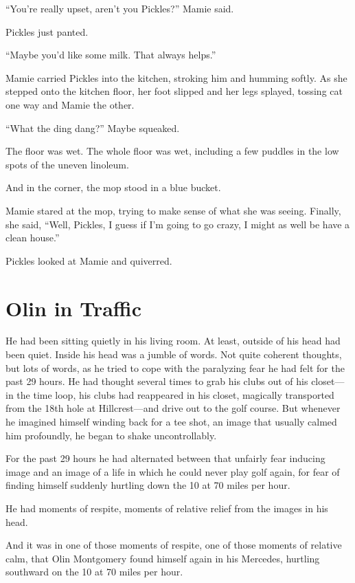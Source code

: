 ``You're really upset, aren't you Pickles?'' Mamie said.

Pickles just panted.

``Maybe you'd like some milk. That always helps.''

Mamie carried Pickles into the kitchen, stroking him and humming softly. As she stepped onto the kitchen floor, her foot slipped and her legs splayed, tossing cat one way and Mamie the other.

``What the ding dang?'' Maybe squeaked.

The floor was wet. The whole floor was wet, including a few puddles in the low spots of the uneven linoleum.

And in the corner, the mop stood in a blue bucket.

Mamie stared at the mop, trying to make sense of what she was seeing. Finally, she said, ``Well, Pickles, I guess if I'm going to go crazy, I might as well be have a clean house.''

Pickles looked at Mamie and quiverred.



\chapter{Olin in Traffic}

 He had been sitting quietly in his living room. At least, outside of his head had been quiet. Inside his head was a jumble of words. Not quite coherent thoughts, but lots of words, as he tried to cope with the paralyzing fear he had felt for the past 29 hours. He had thought several times to grab his clubs out of his closet---in the time loop, his clubs had reappeared in his closet, magically transported from the 18th hole at Hillcrest---and drive out to the golf course. But whenever he imagined himself winding back for a tee shot, an image that usually calmed him profoundly, he began to shake uncontrollably.

For the past 29 hours he had alternated between that unfairly fear inducing image and an image of a life in which he could never play golf again, for fear of finding himself suddenly hurtling down the 10 at 70 miles per hour.

He had moments of respite, moments of relative relief from the images in his head.

And it was in one of those moments of respite, one of those moments of relative calm, that Olin Montgomery found himself again in his Mercedes, hurtling southward on the 10 at 70 miles per hour.

